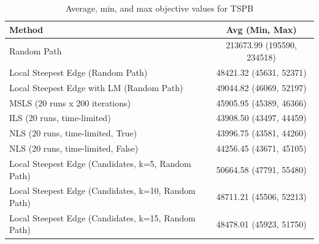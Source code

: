 \begin{table}[h!]
\centering
\begin{tabular}{lc}
\hline
Method & Avg (Min, Max) \\
\hline
Random Path & 213673.99 (195590, 234518) \\
Local Steepest Edge (Random Path) & 48421.32 (45631, 52371) \\
Local Steepest Edge with LM (Random Path) & 49044.82 (46069, 52197) \\
MSLS (20 runs x 200 iterations) & 45905.95 (45389, 46366) \\
ILS (20 runs, time-limited) & 43908.50 (43497, 44459) \\
NLS (20 runs, time-limited, True) & 43996.75 (43581, 44260) \\
NLS (20 runs, time-limited, False) & 44256.45 (43671, 45105) \\
Local Steepest Edge (Candidates, k=5, Random Path) & 50664.58 (47791, 55480) \\
Local Steepest Edge (Candidates, k=10, Random Path) & 48711.21 (45506, 52213) \\
Local Steepest Edge (Candidates, k=15, Random Path) & 48478.01 (45923, 51750) \\
\hline
\end{tabular}
\caption{Average, min, and max objective values for TSPB}
\label{tab:TSPB_scores}
\end{table}
